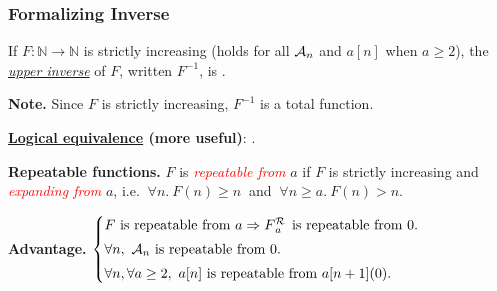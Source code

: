 \begin{frame}
\frametitle{Formalizing Inverse}

If $F: \mathbb{N} \to \mathbb{N}$ is strictly increasing (holds for all $\mathcal{A}_n$ and $a[n]$ when $a\ge 2$),
the \href{https://github.com/inv-ack/inv-ack/blob/7270e64a2600b771f2b1b1b151f7d13fb2ae6c97/inverse.v\#L28-L45}{
	\emph{upper inverse}} of $F$, written $F^{-1}$,
is .

\smallskip

\textbf{Note.} Since $F$ is strictly increasing, $F^{-1}$ is a total function.

\bigskip

\pause 
\textbf{\href{https://github.com/inv-ack/inv-ack/blob/7270e64a2600b771f2b1b1b151f7d13fb2ae6c97/inverse.v\#L65-L77}{Logical equivalence} (more useful)}:
.

\bigskip

\pause
\textbf{Repeatable functions.} $F$ is \textcolor{red}{\emph{repeatable from}} $a$ if $F$ is strictly increasing and \textcolor{red}{\emph{expanding from}} $a$, i.e. $~\forall n.~F(n) \ge n~$ and $~\forall n \ge a.~F(n) > n$.

\vspace{5pt}

\pause
\textbf{Advantage.} $\displaystyle \begin{cases}
F \text{ is repeatable from } a \implies \rf{F}{a}\ \text{ is repeatable from } 0. \\[3pt]
\forall n, \ \Ack_n \text{ is repeatable from } 0. \\[3pt]
\forall n, \forall a \ge 2, \ a[n] \text{ is repeatable from } a[n+1](0).
\end{cases}$


\end{frame}



